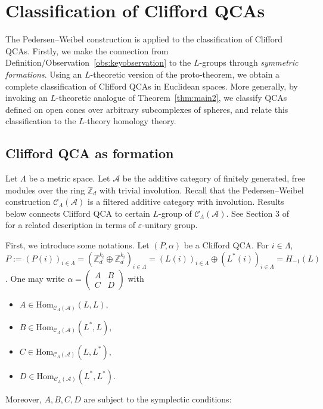\documentclass{article}
\theoremstyle{definition}
\newcommand{\Hom}{\mathrm{Hom}}
\newcommand{\CA}{{ \mathcal A}}
\newcommand{\ZZ}{{\mathbb Z}}
\def \al {\alpha}
\begin{document}
\section{Classification of Clifford QCAs}

The Pedersen--Weibel construction is applied to the classification of Clifford QCAs. Firstly, we make the connection from Definition/Observation~\ref{obs:keyobservation} to the \(L\)-groups through \emph{symmetric formations}. Using an $L$-theoretic version of the proto-theorem, we obtain a complete classification of Clifford QCAs in Euclidean spaces. More generally, by invoking an $L$-theoretic analogue of Theorem~\ref{thm:main2}, we classify QCAs defined on open cones over arbitrary subcomplexes of spheres, and relate this classification to the $L$-theory homology theory.  %


\subsection{Clifford QCA as formation}
Let $\Lambda$ be a metric space.  Let $\CA$ be the additive category of finitely generated, free modules over the ring $\ZZ_d$ with trivial involution. Recall that the Pedersen--Weibel construction $\mathcal{C}_{\Lambda}(\CA)$ is a filtered additive category with involution. Results below connects Clifford QCA to certain $L$-group of $\mathcal{C}_{\Lambda}(\CA)$. See Section 3 of~\cite{haah2025topological} for a related description in terms of $\varepsilon$-unitary group.  

First, we introduce some notations. Let $(P, \al)$ be a Clifford QCA. For $i\in \Lambda$, $P:=(P(i))_{i\in \Lambda}=(\ZZ_d^{k_i}\oplus \ZZ_d^{k_i})_{i\in\Lambda}=(L(i))_{i\in\Lambda}\oplus (L^*(i))_{i\in\Lambda}=H_{-1}(L)$. One may write $\al=\begin{pmatrix}
        A & B\\
        C & D
    \end{pmatrix}$ with 
    \begin{itemize}
        \item $A\in \Hom_{\mathcal{C}_{\Lambda}(\CA)}(L, L),$
        \item $B\in \Hom_{\mathcal{C}_{\Lambda}(\CA)}(L^*, L),$
        \item $C\in \Hom_{\mathcal{C}_{\Lambda}(\CA)}(L, L^*),$
        \item $D\in \Hom_{\mathcal{C}_{\Lambda}(\CA)}(L^*, L^*).$
    \end{itemize} 
    Moreover, $A, B, C, D$ are subject to the symplectic conditions:
    
\end{document}
